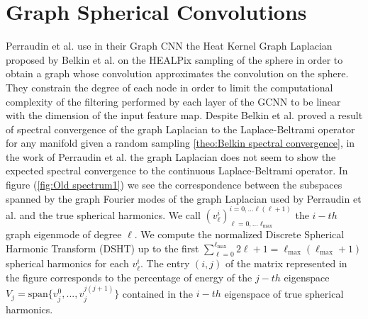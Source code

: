 

\section{Graph Spherical Convolutions}
Perraudin et al. \cite{DeepSphere} use in their Graph CNN the Heat Kernel Graph Laplacian proposed by Belkin et al. \cite{Belkin:2005:TTF:2138147.2138189} on the HEALPix sampling of the sphere in order to obtain a graph whose convolution approximates the convolution on the sphere. They constrain the degree of each node in order to limit the computational complexity of the filtering performed by each layer of the GCNN to be linear with the dimension of the input feature map. Despite Belkin et al. proved a result of spectral convergence of the graph Laplacian to the Laplace-Beltrami operator for any manifold given a random sampling \ref{theo:Belkin spectral convergence}, in the work of Perraudin et al. the graph Laplacian does not seem to show the expected spectral convergence to the continuous Laplace-Beltrami operator. In figure (\ref{fig:Old spectrum1}) we see the correspondence between the subspaces spanned by the graph Fourier modes of the graph Laplacian used by Perraudin et al. and the true spherical harmonics. We call $(v_\ell^i)_{\ell=0,... \ell_\text{max}}^{i=0,...\ell(\ell+1)}$ the $i-th$ graph eigenmode of degree $\ell$. We compute the normalized Discrete Spherical Harmonic Transform (DSHT) up to the first $\sum_{\ell=0}^{\ell_\text{max}{}}2\ell + 1=\ell_{\text{max}}(\ell_\text{max}+1)$ spherical harmonics for each $v_\ell^i$. The entry $(i, j)$ of the matrix represented in the figure corresponds to the percentage of energy of the $j-th$ eigenspace $V_j = \text{span}\{v^0_j, ..., v^{j(j+1)}_j\}$ contained in the $i-th$ eigenspace of true spherical harmonics. 
